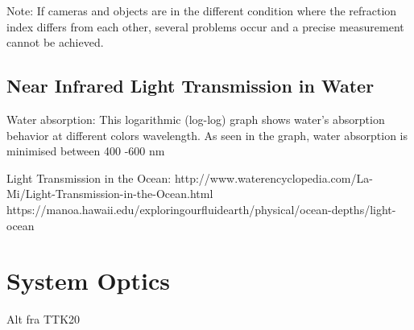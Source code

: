 Note: If cameras and objects are in the different condition where the refraction index differs from each other, several problems occur and a precise measurement cannot be achieved.

\subsection{Near Infrared Light Transmission in Water}



Water absorption: 
This logarithmic (log-log) graph shows water’s absorption behavior at different colors wavelength. As seen in the graph, water absorption is minimised between 400 -600 nm


Light Transmission in the Ocean: http://www.waterencyclopedia.com/La-Mi/Light-Transmission-in-the-Ocean.html
https://manoa.hawaii.edu/exploringourfluidearth/physical/ocean-depths/light-ocean
\vspace{1.3cm}
\section{System Optics}
Alt fra TTK20

\vspace{1.3cm}
